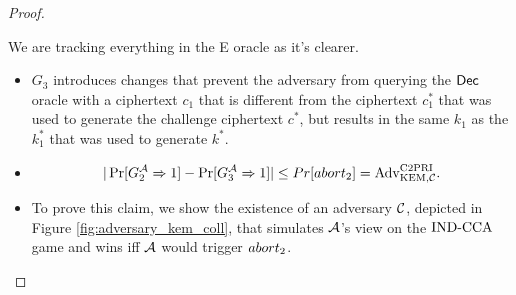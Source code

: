 \begin{proof}
\begin{itemize}
                                                                We are tracking everything in the E oracle as it's clearer.
                                                            \end{itemize}

                                                            \begin{itemize}
                                                            \item[\textbf{Game 3}]
                                                                $G_3$ introduces changes that prevent the adversary from querying the $\textsf{Dec}$ oracle with a ciphertext $c_1$ that is different from the ciphertext $c^*_1$ that was used to generate the challenge ciphertext $c^*$, but results in the same $k_1$ as the $k^*_1$ that was used to generate $k^*$.

                                                            \item[\emph{Claim 3}]

                                                                \[ | \Pr[G^{\mathcal{A}}_{2} \Rightarrow 1] - \Pr[G^{\mathcal{A}}_{3} \Rightarrow 1] | \leq Pr[abort_2] = \text{Adv}_{\text{KEM}, \mathcal{C}}^{\text{C2PRI}}. \]

                                                            \item[\emph{Proof}]
                                                                To prove this claim, we show the existence of an adversary $\mathcal{C}$, depicted in Figure \ref{fig:adversary_kem_coll}, that simulates $\mathcal{A}$'s view on the $\text{IND-CCA}$ game and wins iff $\mathcal{A}$ would trigger $abort_2$.


\end{itemize}
\end{proof}
